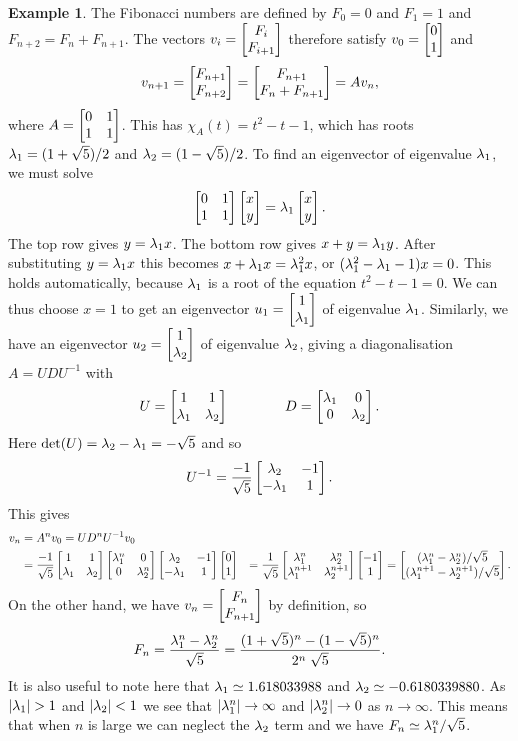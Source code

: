 \documentclass[reqno]{amsart}
\theoremstyle{definition}
\newtheorem{example}[theorem]{Example}
\begin{document}
\begin{example}\label{eg-fibonacci}
 The Fibonacci numbers are defined by $F_0=0$ and $F_1=1$ and
 $F_{n+2}=F_n+F_{n+1}$.  The vectors $v_i=\left[\begin{matrix} F_i\\ F_{i+1}\end{matrix}\right]$
 therefore satisfy $v_0=\left[\begin{matrix} 0\\1\end{matrix}\right]$ and
 \[ v_{n+1}=\left[\begin{matrix} F_{n+1}\\F_{n+2}\end{matrix}\right] =
     \left[\begin{matrix} F_{n+1}\\ F_n+F_{n+1} \end{matrix}\right] = Av_n,
 \]
 where $A=\left[\begin{matrix} 0&1\\1&1\end{matrix}\right]$.  This has $\chi_A(t)=t^2-t-1$, which has
 roots $\lambda_1=(1+\sqrt{5})/2$ and $\lambda_2=(1-\sqrt{5})/2$.  To find an
 eigenvector of eigenvalue $\lambda_1$, we must solve
 \[ \left[\begin{matrix} 0 & 1 \\ 1 & 1 \end{matrix}\right] \left[\begin{matrix} x \\ y \end{matrix}\right] =
     \lambda_1\left[\begin{matrix} x \\ y \end{matrix}\right].
 \]
 The top row gives $y=\lambda_1 x$.  The bottom row gives $x+y=\lambda_1y$.
 After substituting $y=\lambda_1x$ this becomes $x+\lambda_1x=\lambda_1^2x$, or
 $(\lambda_1^2-\lambda_1-1)x=0$.  This holds automatically, because $\lambda_1$ is
 a root of the equation $t^2-t-1=0$.  We can thus choose $x=1$ to get
 an eigenvector $u_1=\left[\begin{matrix} 1\\ \lambda_1\end{matrix}\right]$ of eigenvalue $\lambda_1$.
 Similarly, we have an eigenvector $u_2=\left[\begin{matrix} 1\\ \lambda_2\end{matrix}\right]$ of
 eigenvalue $\lambda_2$, giving a diagonalisation $A=UDU^{-1}$ with 
 \[ U = \left[\begin{matrix} 1&1 \\ \lambda_1 & \lambda_2 \end{matrix}\right] \hspace{4em}
    D = \left[\begin{matrix} \lambda_1 & 0 \\ 0 & \lambda_2 \end{matrix}\right].
 \] 
 Here $\det(U)=\lambda_2-\lambda_1=-\sqrt{5}$ and so 
 \[ U^{-1} = \frac{-1}{\sqrt{5}}
     \left[\begin{matrix} \lambda_2 & - 1 \\ -\lambda_1 & 1\end{matrix}\right].
 \]
 This gives 
 \begin{align*}
  v_n &= A^nv_0 = UD^nU^{-1}v_0 \\
      &= \frac{-1}{\sqrt{5}}
         \left[\begin{matrix} 1&1 \\ \lambda_1 & \lambda_2 \end{matrix}\right]
         \left[\begin{matrix} \lambda_1^n & 0 \\ 0 & \lambda_2^n \end{matrix}\right]
         \left[\begin{matrix} \lambda_2 & - 1 \\ -\lambda_1 & 1\end{matrix}\right] 
         \left[\begin{matrix} 0 \\ 1 \end{matrix}\right]
      &= \frac{1}{\sqrt{5}}
         \left[\begin{matrix} \lambda_1^n & \lambda_2^n \\ \lambda_1^{n+1} & \lambda_2^{n+1} \end{matrix}\right]
         \left[\begin{matrix} -1 \\ 1 \end{matrix}\right] 
       = \left[\begin{matrix} (\lambda_1^n-\lambda_2^n)/\sqrt{5} \\
              (\lambda_1^{n+1}-\lambda_2^{n+1})/\sqrt{5} \end{matrix}\right]. 
 \end{align*}
 On the other hand, we have $v_n=\left[\begin{matrix} F_n\\ F_{n+1}\end{matrix}\right]$ by
 definition, so 
 \[ F_n = \frac{\lambda_1^n-\lambda_2^n}{\sqrt{5}} = 
     \frac{(1+\sqrt{5})^n-(1-\sqrt{5})^n}{2^n\;\sqrt{5}}.
 \]
 It is also useful to note here that $\lambda_1\simeq 1.618033988$ and
 $\lambda_2\simeq -0.6180339880$.  As $|\lm_1|>1$ and $|\lambda_2|<1$ we see
 that $|\lambda_1^n|\to\infty$ and $|\lambda_2^n|\to 0$ as $n\to\infty$.  This
 means that when $n$ is large we can neglect the $\lambda_2$ term and we
 have $F_n\simeq\lambda_1^n/\sqrt{5}$.  
\end{example}
\end{document}

